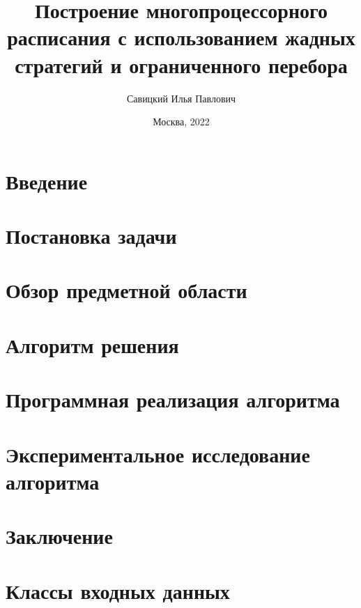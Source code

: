 \documentclass[12pt]{article}
\author{Савицкий Илья Павлович}
\title{Построение многопроцессорного расписания с использованием жадных стратегий и ограниченного перебора}
\date{Москва, 2022}
\begin{document}

\newpage
\begin{abstract}
    
\end{abstract}
\newpage
\tableofcontents
\newpage
\section{Введение}

\newpage
\section{Постановка задачи}

\newpage
\section{Обзор предметной области}


\newpage
\section{Алгоритм решения}


\newpage
\section{Программная реализация алгоритма}


\newpage
\section{Экспериментальное исследование алгоритма}


\newpage
\section{Заключение}


\newpage
\printbibliography

\appendix

\newpage
\section{Классы входных данных}

\end{document}
